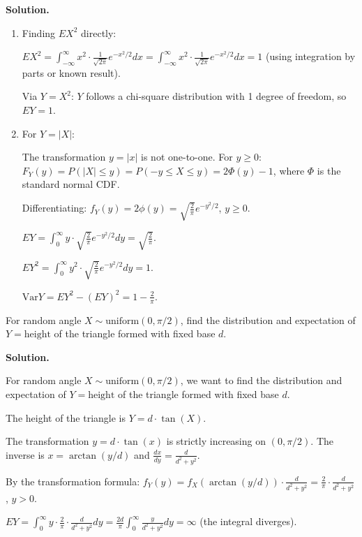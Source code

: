\noindent\textbf{Solution.}
\begin{enumerate}[label=(\alph*)]
    \item Finding $EX^2$ directly:
    
    $EX^2 = \int_{-\infty}^{\infty} x^2 \cdot \frac{1}{\sqrt{2\pi}}e^{-x^2/2}dx = \int_{-\infty}^{\infty} x^2 \cdot \frac{1}{\sqrt{2\pi}}e^{-x^2/2}dx = 1$ (using integration by parts or known result).
    
    Via $Y = X^2$: $Y$ follows a chi-square distribution with 1 degree of freedom, so $EY = 1$.
    
    \item For $Y = |X|$:
    
    The transformation $y = |x|$ is not one-to-one. For $y \geq 0$:
    $F_Y(y) = P(|X| \leq y) = P(-y \leq X \leq y) = 2\Phi(y) - 1$, where $\Phi$ is the standard normal CDF.
    
    Differentiating: $f_Y(y) = 2\phi(y) = \sqrt{\frac{2}{\pi}}e^{-y^2/2}$, $y \geq 0$.
    
    $EY = \int_0^\infty y \cdot \sqrt{\frac{2}{\pi}}e^{-y^2/2}dy = \sqrt{\frac{2}{\pi}}$.
    
    $EY^2 = \int_0^\infty y^2 \cdot \sqrt{\frac{2}{\pi}}e^{-y^2/2}dy = 1$.
    
    $\text{Var}Y = EY^2 - (EY)^2 = 1 - \frac{2}{\pi}$.
\end{enumerate}

\begin{problembox}
For random angle $X\sim\text{uniform}(0,\pi/2)$, find the distribution and expectation of $Y=\text{height}$ of the triangle formed with fixed base $d$.
\end{problembox}

\noindent\textbf{Solution.}

For random angle $X \sim \text{uniform}(0,\pi/2)$, we want to find the distribution and expectation of $Y = \text{height}$ of the triangle formed with fixed base $d$.

The height of the triangle is $Y = d \cdot \tan(X)$.

The transformation $y = d \cdot \tan(x)$ is strictly increasing on $(0,\pi/2)$. The inverse is $x = \arctan(y/d)$ and $\frac{dx}{dy} = \frac{d}{d^2 + y^2}$.

By the transformation formula: $f_Y(y) = f_X(\arctan(y/d)) \cdot \frac{d}{d^2 + y^2} = \frac{2}{\pi} \cdot \frac{d}{d^2 + y^2}$, $y > 0$.

$EY = \int_0^\infty y \cdot \frac{2}{\pi} \cdot \frac{d}{d^2 + y^2}dy = \frac{2d}{\pi} \int_0^\infty \frac{y}{d^2 + y^2}dy = \infty$ (the integral diverges).

